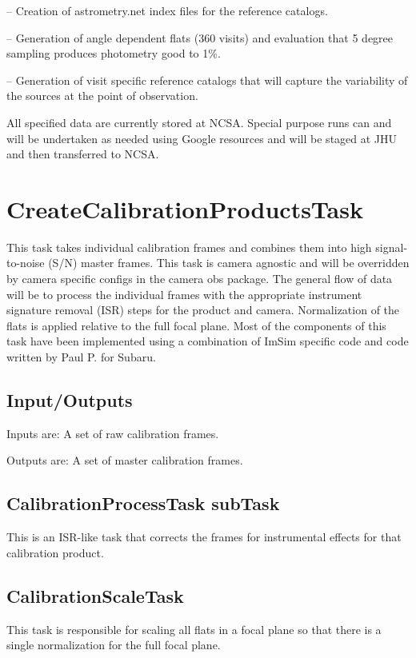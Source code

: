 \documentclass[prd, nofootinbib, floatfix, 11pt,tightenlines,times]{article}
\begin{document}
-- Creation of astrometry.net index files for the reference catalogs.

-- Generation of angle dependent flats (360 visits) and evaluation
that 5 degree sampling produces photometry good to 1\%.

-- Generation of visit specific reference catalogs that will capture
the  variability of the sources at the point of observation.

All specified data are currently stored at NCSA.  Special purpose runs
can and will be undertaken as needed using Google resources and
will be staged at JHU and then transferred to NCSA.  


\section{CreateCalibrationProductsTask} 
This task takes individual calibration frames and combines them into
high signal-to-noise (S/N) master frames.  
This task is camera agnostic and will be overridden by camera specific
configs in the camera obs package.  The general flow of data will be
to process the individual frames with the appropriate instrument
signature removal (ISR) steps for the product and camera.
Normalization of the flats is applied relative to the full focal
plane. Most of the components of this task have been implemented using
a combination of ImSim specific code and code written by Paul P. for
Subaru.

\subsection{Input/Outputs}
Inputs are: A set of raw calibration frames.

Outputs are: A set of master calibration frames.

\subsection{CalibrationProcessTask subTask}
This is an ISR-like task that corrects the frames for instrumental effects for that calibration
product.

\subsection{CalibrationScaleTask}
This task is responsible for
scaling all flats in a focal plane so that there is a single normalization for the full focal plane.
\end{document}
